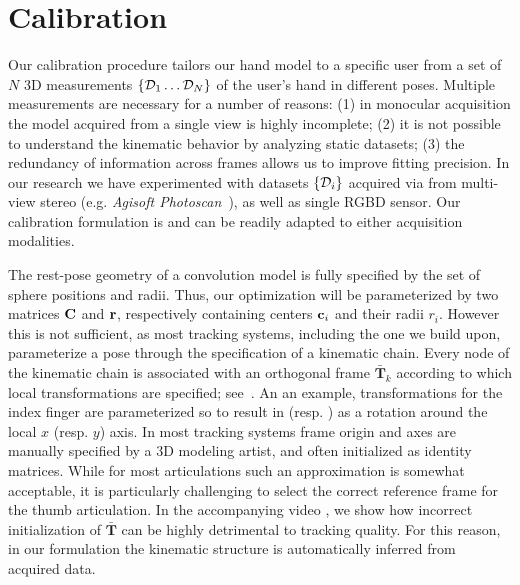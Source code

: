\section{Calibration}
Our calibration procedure tailors our hand model to a specific user from a set of $N$ 3D measurements $\{ \mathcal{D}_1 \dots \mathcal{D}_N \}$ of the user's hand in different poses. Multiple measurements are necessary for a number of reasons: (1) in monocular acquisition the model acquired from a single view is highly incomplete; (2) it is not possible to understand the kinematic behavior by analyzing static datasets; (3) the redundancy of information across frames allows us to improve fitting precision. In our research we have experimented with datasets $\{\mathcal{D}_i\}$ acquired via from multi-view stereo (e.g. \emph{Agisoft Photoscan~\textcopyright}), as well as single RGBD sensor. Our calibration formulation is  and can be readily adapted to either acquisition modalities.

The rest-pose geometry of a convolution model is fully specified by the set of sphere positions and radii. Thus, our optimization will be parameterized by two matrices $\mathbf{C}$ and $\mathbf{r}$, respectively containing centers $\mathbf{c}_i$ and their radii $r_i$. However this is not sufficient, as most tracking systems, including the one we build upon, parameterize a pose through the specification of a kinematic chain. 
Every node of the kinematic chain is associated with an orthogonal frame $\mathbf{\bar{T}}_k$ according to which local transformations are specified; see~. An an example, transformations for the index finger are parameterized so to result in  (resp. ) as a rotation around the local $x$ (resp. $y$) axis. In most tracking systems frame origin and axes are manually specified by a 3D modeling artist, and often initialized as identity matrices. While for most articulations such an approximation is somewhat acceptable, it is particularly challenging to select the correct reference frame for the thumb articulation. In the accompanying video \todo{[00:00]}, we show how incorrect initialization of $\mathbf{\bar{T}}$ can be highly detrimental to tracking quality. For this reason, in our formulation the kinematic structure is automatically inferred from acquired data.

